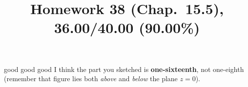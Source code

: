 \documentclass[pstricks,10pt,dvipsnames]{article} %
\title{Homework 38 (Chap.~15.5),
36.00/40.00 (90.00\%)
}
\begin{document}
\maketitle
{}
good
good
good
I think the part you sketched is \textbf{one-sixteenth}, not one-eighth (remember that
figure lies both \textit{above} and \textit{below} the plane $z=0$).
\end{document}
